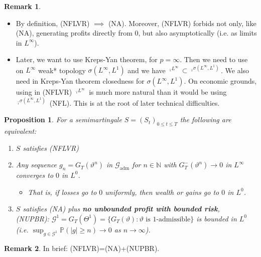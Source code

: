 \documentclass[12pt,a4paper, twoside]{article}
\newtheorem{prop}{Proposition}[section]
\theoremstyle{definition}
\newtheorem{rem}{Remark}[section]
\newcommand{\PP}{\mathbb{P}} %
\begin{document}
\begin{rem} \ \begin{itemize}
\item By definition, (NFLVR) $\implies$ (NA). Moreover, (NFLVR) forbids not only, like (NA), generating profits directly from $0$, but also asymptotically (i.e. as limits in $L^\infty$).
\item Later, we want to use Kreps-Yan theorem, for $p= \infty$. Then we need to use on $L^\infty$ weak* topology $\sigma( L^\infty, L^1)$ and we have $\overline{\cdot}^{L^\infty} \subset \overline{\cdot}^{\sigma(L^\infty, L^1)}$. We also need in Kreps-Yan theorem closedness for $\sigma(L^\infty, L^1)$. On economic grounds, using in (NFLVR) $\overline{\cdot}^{L^\infty}$ is much more natural than it would be using $\overline{\cdot}^{\sigma(L^\infty, L^1)}$ (NFL). This is at the root of later technical difficulties. 
\end{itemize}
\end{rem}
\begin{prop} \label{P43} For a semimartingale $S=(S_t)_{0 \leq t \leq T}$ the following are equivalent: 
\begin{enumerate}
\item $S$ satisfies (NFLVR) 
\item Any sequence $g_n= G_T( \vartheta^n)$ in $\mathcal{G}_\text{adm}$ for $n \in \mathbb{N}$ with $G_T^-( \vartheta^n) \to 0$ in $L^\infty$ converges to $0$ in $L^0$.
\begin{itemize}
\item That is, if losses go to $0$ uniformly, then wealth or gains go to $0$ in $L^0$. 
\end{itemize}
\item $S$ satisfies (NA) plus \textbf{no unbounded profit with bounded risk}, \\
(NUPBR): $\mathcal{G}^1 = G_T( \Theta^1)= \{ G_T( \vartheta): \vartheta \text{ is $1$-admissible}\}$ is bounded in $L^0$ (i.e. $\sup_{g \in \mathcal{G}^1} \PP( |g| \geq n) \to 0$ as $n \to \infty$).
\end{enumerate}
\end{prop}
\begin{rem} In brief: (NFLVR)=(NA)+(NUPBR).
\end{rem}
\end{document}
